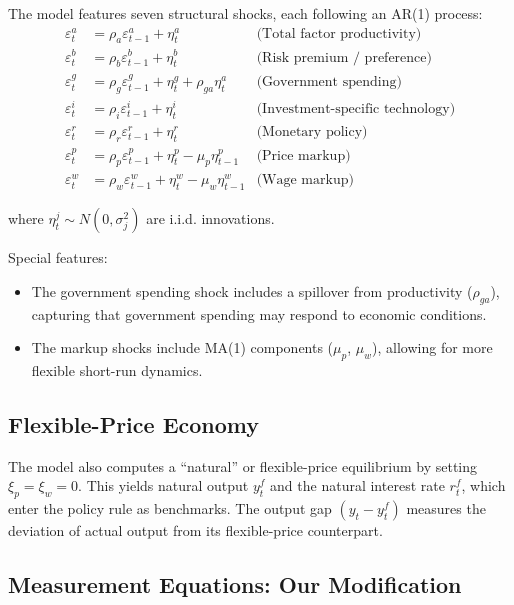 \documentclass[12pt]{article}
\begin{document}
The model features seven structural shocks, each following an AR(1) process:
\begin{align}
\varepsilon^a_t &= \rho_a \varepsilon^a_{t-1} + \eta^a_t & \text{(Total factor productivity)} \label{eq:shock_a}\\
\varepsilon^b_t &= \rho_b \varepsilon^b_{t-1} + \eta^b_t & \text{(Risk premium / preference)} \label{eq:shock_b}\\
\varepsilon^g_t &= \rho_g \varepsilon^g_{t-1} + \eta^g_t + \rho_{ga}\eta^a_t & \text{(Government spending)} \label{eq:shock_g}\\
\varepsilon^i_t &= \rho_i \varepsilon^i_{t-1} + \eta^i_t & \text{(Investment-specific technology)} \label{eq:shock_i}\\
\varepsilon^r_t &= \rho_r \varepsilon^r_{t-1} + \eta^r_t & \text{(Monetary policy)} \label{eq:shock_r}\\
\varepsilon^p_t &= \rho_p \varepsilon^p_{t-1} + \eta^p_t - \mu_p\eta^p_{t-1} & \text{(Price markup)} \label{eq:shock_p}\\
\varepsilon^w_t &= \rho_w \varepsilon^w_{t-1} + \eta^w_t - \mu_w\eta^w_{t-1} & \text{(Wage markup)} \label{eq:shock_w}
\end{align}

where $\eta^j_t \sim N(0, \sigma^2_j)$ are i.i.d. innovations.

Special features:
\begin{itemize}
    \item The government spending shock includes a spillover from productivity ($\rho_{ga}$), capturing that government spending may respond to economic conditions.
    \item The markup shocks include MA(1) components ($\mu_p$, $\mu_w$), allowing for more flexible short-run dynamics.
\end{itemize}

\subsection{Flexible-Price Economy}

The model also computes a ``natural'' or flexible-price equilibrium by setting $\xi_p = \xi_w = 0$. This yields natural output $y^f_t$ and the natural interest rate $r^f_t$, which enter the policy rule as benchmarks. The output gap $(y_t - y^f_t)$ measures the deviation of actual output from its flexible-price counterpart.

\subsection{Measurement Equations: Our Modification}
\end{document}
